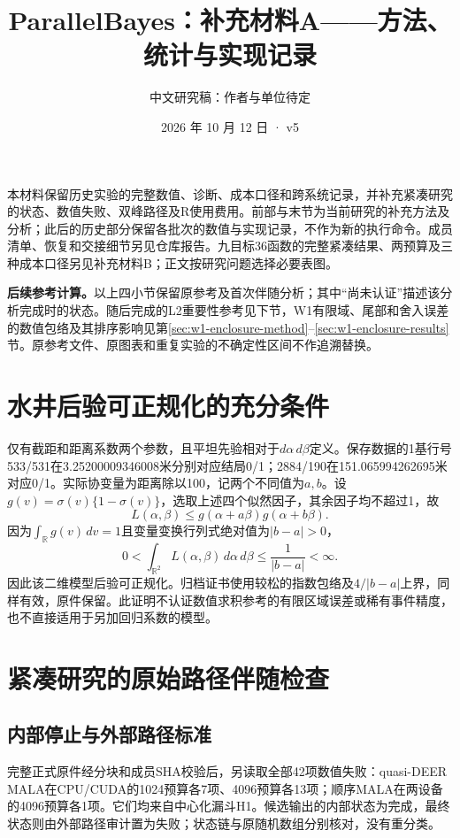 \documentclass[UTF8,fontset=fandol,zihao=-4]{ctexart}
\title{ParallelBayes：补充材料A——方法、统计与实现记录}
\author{中文研究稿：作者与单位待定}
\date{2026 年 10 月 12 日 · v5}
\begin{document}
\maketitle
\noindent 本材料保留历史实验的完整数值、诊断、成本口径和跨系统记录，并补充紧凑研究的状态、数值失败、双峰路径及R使用费用。前部与末节为当前研究的补充方法及分析；此后的历史部分保留各批次的数值与实现记录，不作为新的执行命令。成员清单、恢复和交接细节另见仓库报告。九目标36函数的完整紧凑结果、两预算及三种成本口径另见补充材料B；正文按研究问题选择必要表图。
\setcounter{tocdepth}{1}\tableofcontents
\clearpage



\noindent\textbf{后续参考计算。}以上四小节保留原参考及首次伴随分析；其中“尚未认证”描述该分析完成时的状态。随后完成的L2重要性参考见下节，W1有限域、尾部和舍入误差的数值包络及其排序影响见第\ref{sec:w1-enclosure-method}--\ref{sec:w1-enclosure-results}节。原参考文件、原图表和重复实验的不确定性区间不作追溯替换。





\section{水井后验可正规化的充分条件}
仅有截距和距离系数两个参数，且平坦先验相对于$d\alpha\,d\beta$定义。保存数据的1基行号533/531在3.25200009346008米分别对应结局0/1；2884/190在151.065994262695米对应0/1。实际协变量为距离除以100，记两个不同值为$a,b$。设$g(v)=\sigma(v)\{1-\sigma(v)\}$，选取上述四个似然因子，其余因子均不超过1，故
\[
L(\alpha,\beta)\leq g(\alpha+a\beta)g(\alpha+b\beta).
\]
因为$\int_{\mathbb R}g(v)\,dv=1$且变量变换行列式绝对值为$|b-a|>0$，
\[
0<\int_{\mathbb R^2}L(\alpha,\beta)\,d\alpha\,d\beta
\leq\frac{1}{|b-a|}<\infty.
\]
因此该二维模型后验可正规化。归档证书使用较松的指数包络及$4/|b-a|$上界，同样有效，原件保留。此证明不认证数值求积参考的有限区域误差或稀有事件精度，也不直接适用于另加回归系数的模型。

\section{紧凑研究的原始路径伴随检查}
\subsection{内部停止与外部路径标准}
完整正式原件经分块和成员SHA校验后，另读取全部42项数值失败：quasi-DEER MALA在CPU/CUDA的1024预算各7项、4096预算各13项；顺序MALA在两设备的4096预算各1项。它们均来自中心化漏斗H1。候选输出的内部状态为完成，最终状态则由外部路径审计置为失败；状态链与原随机数组分别核对，没有重分类。
\end{document}
